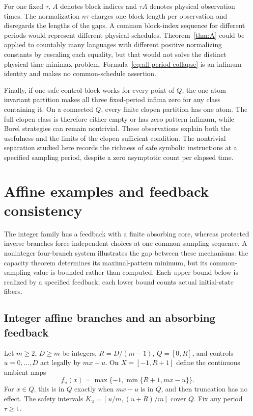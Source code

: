 \documentclass[11pt,reqno]{amsart}
\numberwithin{equation}{section}
\theoremstyle{definition}
\begin{document}
For one fixed $\tau$, $A$ denotes block indices and $\tau A$ denotes
physical observation times. The normalization $n\tau$ charges one block
length per observation and disregards the lengths of the gaps. A common
block-index sequence for different periods would represent different
physical schedules. Theorem~\ref{thm:A} could be applied to countably many
languages with different positive normalizing constants by rescaling
each equality, but that would not solve the distinct physical-time
minimax problem. Formula~\eqref{eq:all-period-collapse} is an infimum
identity and makes no common-schedule assertion.

Finally, if one safe control block works for every point of $Q$, the
one-atom invariant partition makes all three fixed-period infima zero
for any class containing it. On a connected $Q$, every finite clopen
partition has one atom. The full clopen class is therefore either empty
or has zero pattern infimum, while Borel strategies can remain
nontrivial. These observations explain both the usefulness and the
limits of the clopen sufficient condition. The nontrivial separation
studied here records the richness of safe symbolic instructions at a
specified sampling period, despite a zero asymptotic count per elapsed
time.


\section{Affine examples and feedback consistency}\label{sec:affine}

The integer family has a feedback with a finite absorbing core,
whereas protected inverse branches force independent choices at
one common sampling sequence. A noninteger four-branch system
illustrates the gap between these mechanisms: the capacity theorem
determines its maximal-pattern minimum, but its common-sampling
value is bounded rather than computed. Each upper bound below is
realized by a specified feedback; each lower bound counts actual
initial-state fibers.

\subsection{Integer affine branches and an absorbing feedback}
Let $m\ge2$, $D\ge m$ be integers, $R=D/(m-1)$,
$Q=[0,R]$, and controls $u=0,\ldots,D$ act legally by $mx-u$.
On $X=[-1,R+1]$ define the continuous ambient maps
\[
 f_u(x)=\max\{-1,\min\{R+1,mx-u\}\}.
\]
For $x\in Q$, this is in $Q$ exactly when $mx-u$ is in $Q$,
and then truncation has no effect. The safety intervals
$K_u=[u/m,(u+R)/m]$ cover $Q$. Fix any period $\tau\ge1$.
\end{document}
